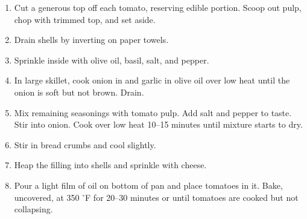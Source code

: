 
\begin{ingredients}
\end{ingredients}


\begin{recipe}
  \begin{enumerate}

  \item Cut a generous top off each tomato, reserving edible
  portion.  Scoop out pulp, chop with trimmed top, and set aside.

  \item Drain shells by inverting on paper towels.

  \item Sprinkle inside with olive oil, basil, salt, and pepper.

  \item In large skillet,  cook onion in  and garlic in olive oil over low
  heat until the onion is soft but not brown.  Drain.
  
\item Mix remaining seasonings with tomato pulp.  Add salt and pepper
  to taste.  Stir into onion.  Cook over low heat 10--15 minutes until
  mixture starts to dry.

\item Stir in bread crumbs and cool slightly.

\item Heap the filling into shells and sprinkle with cheese.

\item Pour a light film of oil on bottom of pan and place tomatoes in
  it.  Bake, uncovered, at 350 $^\circ$F for 20--30 minutes or until
  tomatoes are cooked but not collapsing.

  \end{enumerate}
\end{recipe}
